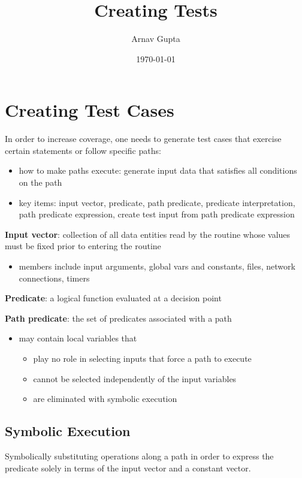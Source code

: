 \documentclass[11pt]{article}
\author{Arnav Gupta}
\date{\today}
\title{Creating Tests}
\begin{document}
\maketitle
\tableofcontents

\section{Creating Test Cases}
\label{sec:org861de45}
In order to increase coverage, one needs to generate
test cases that exercise certain statements or follow
specific paths:
\begin{itemize}
\item how to make paths execute: generate input data that
satisfies all conditions on the path
\item key items: input vector, predicate, path predicate,
predicate interpretation, path predicate expression,
create test input from path predicate expression
\end{itemize}

\textbf{Input vector}: collection of all data entities
read by the routine whose values must be fixed
prior to entering the routine
\begin{itemize}
\item members include input arguments, global vars and
constants, files, network connections, timers
\end{itemize}

\textbf{Predicate}: a logical function evaluated at a
decision point

\textbf{Path predicate}: the set of predicates associated
with a path
\begin{itemize}
\item may contain local variables that
\begin{itemize}
\item play no role in selecting inputs that force
a path to execute
\item cannot be selected independently of the input
variables
\item are eliminated with symbolic execution
\end{itemize}
\end{itemize}
\subsection{Symbolic Execution}
\label{sec:org5d986d4}
Symbolically substituting
operations along a path in order to express
the predicate solely in terms of the input
vector and a constant vector.
\end{document}
